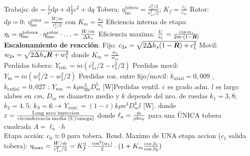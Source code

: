 \formuleoseparator


\begin{formuleo}[T. de Vapor]
Trabajo: $\mathrm{d} e=\frac{1}{\rho} \mathrm{d} p+\mathrm{d} \frac{1}{2} c^{2}+\mathrm{d} q$\separar
Tobera: $\eta_{\mathrm{iso}}^{\mathrm{tobera}}=\frac{c_{1}^{2} / 2}{c_{1 s}^{2} / 2}$; $K_{f}=\frac{c_{1}}{c_{1 s}}$ \separar 
Rotor: $dp=0:\ \eta_{\mathrm{iso}}^{\mathrm{rotor}}=\frac{\dot{W} / \dot{m}}{c_{1}^{2} / 2}$ con $K_{m}=\frac{w_{2}}{w_{1}}$ \separar Eficiencia interna de etapa: $\eta_{i}=\eta_{\mathrm{iso}}^{\mathrm{tobera}} \cdot \eta_{\mathrm{liso}}^{\mathrm{rotor}} \cdot \ldots=\frac{\dot{W} / \dot{m}}{\Delta h_{s}}$ Eficiencia maxima: $\frac{U}{c_{1}}=\frac{\cos \alpha_{1}}{2m \cdot(1-{\bm{R}})} $ \\ 
\textbf{Escalonamiento de reacción}. Fijo: $c_{2s}=\sqrt{2 \Delta h_{s}(1-{\bm{R}} )+c_{1}^{2}}$  Movil: $w_{2s}=\sqrt{2 \Delta h_{s}{\bm{R}} +
w_{1}^{2}}$ donde $K_m = \frac{w_2}{w_{2s}}$\\ Perdidas tobera: $Y_{\mathrm{tob.}}=\dot{m}(c^2_{1s}/2-c^2_1/2)$  Perdidas movil: $Y_{\mathrm{m}} = \dot{m}(w_1^2/2 - w_2^2/2)$
Perdidas roz. entre fijo/movil: $k_{\mathrm{axial}}=0,009$ ,$k_{\mathrm{radial}}=0,027$ : $Y_{\mathrm{roz.}}=k \rho n_{\mathrm{Hz}}^{3} D_m^{5}$ [W]\separar Perdidas ventil. $\varepsilon$ es grado adm. $l$ es largo alabes en \emph{cm}, $D_m$ es diametro medio y $k$ depende del nro. de ruedas $k_1=3,8$; $k_2=4,5$; $k_3=6 \rightarrow $ $Y_{\mathrm{vent.}}=(1-\varepsilon) k \rho n^{3} D_m^{4} l$ [W].  donde $\varepsilon = \frac{\text{Long arco inyeccion}}{\text{circunferencia media (U/omega)}}$ donde $\ell_a = \frac{\dot{m}}{\rho h c_0}$ para una ÚNICA tobera cuadrada $A=\ell_a \cdot h$  \\
Etapa acción: $c_0\approx 0$ para tobera. Rend. Maximo de UNA etapa accion ($c_1$ salida tobera): $\eta_{\max} = \frac{\dot{W}/\dot{m}}{c_{1s}^2/2}= K_f^2 \cdot \frac{\cos^2(\alpha_1)}{2}\cdot (1+K_m \frac{\cos \beta_1}{\cos \beta_2})$
\end{formuleo}


\formuleoseparator


